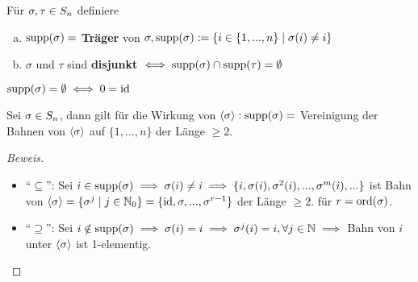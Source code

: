 \documentclass[a4paper]{report}
\begin{document}
\begin{defi}
  Für $\sigma, \tau \in S_n$ definiere
  \begin{enumerate}[(a)]
    \item $\operatorname{supp}(\sigma) =$ \textbf{Träger} von $\sigma, \operatorname{supp}(\sigma) := \{i \in \{1, ..., n\} \mid \sigma(i) \ne i\}$
    \item $\sigma$ und $\tau$ sind \textbf{disjunkt} $\iff \operatorname{supp}(\sigma) \cap \operatorname{supp}(\tau) = \emptyset$
  \end{enumerate}
\end{defi}

\begin{bem*}
$\operatorname{supp}(\sigma) = \emptyset \iff 0 = \operatorname{id}$
\end{bem*}

\begin{lemm}
  Sei $\sigma \in S_n$, dann gilt für die Wirkung von $\langle \sigma \rangle : \operatorname{supp}(\sigma) =$ Vereinigung der Bahnen von $\langle \sigma \rangle$ auf $\{1, ..., n\}$ der Länge $\ge 2$.
\end{lemm}
\begin{proof}[Beweis] \item
\begin{itemize}
\item ``$\subseteq$'': Sei $i \in \operatorname{supp}(\sigma) \implies \sigma(i) \ne i \implies \{i, \sigma(i), \sigma^{2}(i), ..., \sigma^{m}(i), ...\}$ ist Bahn von $\langle\sigma\rangle = \{\sigma^{j} \mid j \in \mathbb{N}_0\} = \{\operatorname{id}, \sigma, ..., \sigma^{r-1}\}$ der Länge $\ge 2$. für $r = \operatorname{ord}(\sigma)$.
\item ``$\supseteq$'': Sei $i \notin \operatorname{supp}(\sigma) \implies \sigma(i) = i \implies \sigma^{j}(i) = i, \forall j \in \mathbb{N} \implies$ Bahn von $i$ unter $\langle\sigma\rangle$ ist 1-elementig.
\end{itemize}
\end{proof}
\end{document}
